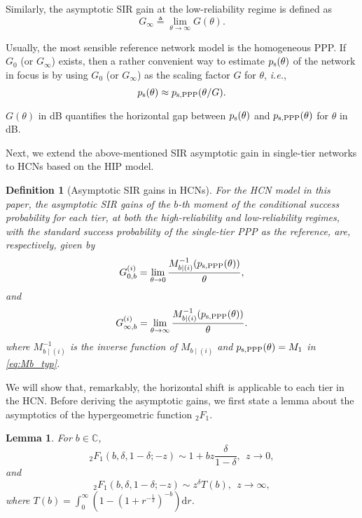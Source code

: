 \documentclass[12pt,draftclsnofoot,journal,onecolumn]{IEEEtran}
\def\ie{{\em i.e.}}
\def\dd{\mathrm{d}}
\newtheorem{lemma}{Lemma}
\newtheorem{definition}{Definition}
\begin{document}
Similarly, the asymptotic SIR gain at the low-reliability regime is defined as
\begin{equation}\label{eq:HorizonGapInf}
G_\infty \triangleq \lim_{\theta\to \infty}G(\theta).
\end{equation}

Usually, the most sensible reference network model is the homogeneous PPP. If $G_0$ (or $G_\infty$) exists, then a rather convenient way to estimate $p_{\rm s}(\theta)$ of the network in focus is by using $G_0$ (or $G_\infty$) as the scaling factor $G$ for $\theta$, \ie,
\begin{equation}\label{eq:HorizonGap4}
p_{\rm s}(\theta) \approx p_{\rm s, PPP}({\theta/G}).
\end{equation}

$G(\theta)$ in dB quantifies the horizontal gap between $p_{\rm s}(\theta)$ and $p_{\rm s, PPP}(\theta)$ for $\theta$ in dB.

Next, we extend the above-mentioned SIR asymptotic gain in single-tier networks to HCNs based on the HIP model.
\begin{definition}[Asymptotic SIR gains in HCNs]
	For the HCN model in this paper, the asymptotic SIR gains of the $b$-th moment of the conditional success probability for each tier, at both the high-reliability and low-reliability regimes, with the standard success probability of the single-tier PPP as the reference, are, respectively, given by 
\begin{equation}\label{eq:AsymptGainMb}
G_{0,b}^{(i)} = \lim_{\theta\to 0}\frac{M_{b\mid(i)}^{-1}(p_{\rm s, PPP}(\theta))}{\theta},
\end{equation}
and 	
\begin{equation}\label{eq:AsymptGainMbInf}
G_{\infty,b}^{(i)} = \lim_{\theta\to \infty}\frac{M_{b\mid(i)}^{-1}(p_{\rm s, PPP}(\theta))}{\theta}.
\end{equation}	
where $M_{b\mid(i)}^{-1}$ is the inverse function of $M_{b\mid(i)}$ and $p_{\rm s, PPP}(\theta) = M_1$ in \eqref{eq:Mb_typ}.
\end{definition}

We will show that, remarkably, the horizontal shift is applicable to each tier in the HCN. Before deriving the asymptotic gains, we first state a lemma about the asymptotics of the hypergeometric function $_2F_1$. 
\begin{lemma}\label{lem:Asymp2F1}
	For $b\in\mathbb{C}$,	
	\begin{equation}\label{eq:Asymp2F1_0}
	_2F_1(b,\delta,1-\delta;-z) \sim 1+bz\frac{\delta}{1-\delta}, ~~z\to 0,
	\end{equation}
	and
	\begin{equation}\label{eq:Asymp2F1_Inf}
	_2F_1(b,\delta,1-\delta;-z) \sim z^\delta T(b), ~~z\to \infty,
	\end{equation}
	where $T(b)=\int_0^\infty(1-(1+r^{-\frac{1}{\delta}})^{-b})\dd r$.
\end{lemma}
\end{document}
